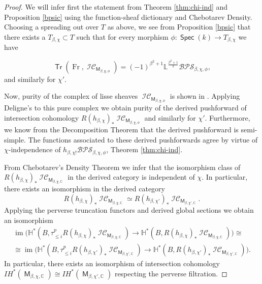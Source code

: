 \documentclass{article}
\DeclareMathOperator{\image}{im}
\DeclareMathOperator{\M}{{\mathsf{M}}}
\DeclareMathOperator{\Tr}{\mathsf{Tr}}
\DeclareMathOperator{\Fr}{Fr}
\DeclareMathOperator{\Spec}{\mathsf{Spec}}
\DeclareMathOperator{\CIC}{\mathcal{IC}}
\newcommand{\BC}{{\mathbb{C}}}
\newcommand{\BH}{{\mathbb{H}}}
\newcommand{\BL}{{\mathbb{L}}}
\newcommand{\BPS}{\mathcal{BPS} }
\theoremstyle{definition}
\theoremstyle{plain}
\begin{document}
\begin{proof}

We will infer first the statement from Theorem \ref{thm:chi-ind} and Proposition \ref{bpsic} using the function-sheaf dictionary and Chebotarev Density. Choosing a spreading out over $T$ as above, we see from  Proposition \ref{bpsic} that there exists a $T_{\beta,\chi} \subset T$ such that for every morphism $\phi:\Spec(k) \to T_{\beta,\chi}$ we have

\[\Tr(\Fr,\CIC_{\M_{\beta,\chi,\phi}}) = (-1)^{\beta^2+1} \BL^{\frac{\beta^2+1}{2}} \BPS_{\beta,\chi,\phi},  \]
and similarly for $\chi'$.

Now, purity of the complex of lisse sheaves $\CIC_{\M_{\beta,\chi,\phi}}$ is shown in \cite[Corollaire 5.3.4]{beilinson2018faisceaux}. Applying Deligne's \cite[Proposition 6.2.6]{deligne1980conjecture} to this pure complex we obtain purity of the derived pushforward of intersection cohomology $R(h_{\beta,\chi})_*\CIC_{\M_{\beta,\chi,\phi}}$ and similarly for $\chi'$. Furthermore, we know from the Decomposition Theorem that the derived pushforward is semi-simple.
The functions associated to these derived pushforwards agree by virtue of $\chi$-independence of $h_{\beta,\chi!}\BPS_{\beta,\chi,\phi}$, Theorem \ref{thm:chi-ind}.

From Chebotarev's Density Theorem we infer that the isomorphism class of $R(h_{\beta,\chi})_*\CIC_{\M_{\beta,\chi,\BC}}$ in the derived category is independent of $\chi$. In particular, there exists an isomorphism in the derived category
$$R(h_{\beta,\chi})_*\CIC_{\M_{\beta,\chi,\BC}} \simeq R(h_{\beta,\chi'})_*\CIC_{\M_{\beta,\chi',\BC}}.$$
Applying the perverse truncation functors and derived global sections we obtain an isomorphism
\begin{eqnarray*}\image \big(\BH^*(B,\tau^p_{\leq i}R(h_{\beta,\chi})_*\CIC_{\M_{\beta,\chi,\BC}}) \to \BH^*(B,R(h_{\beta,\chi})_*\CIC_{\M_{\beta,\chi,\BC}})\big) \cong \\ \cong \image \big(\BH^*(B,\tau^p_{\leq i}R(h_{\beta,\chi'})_*\CIC_{\M_{\beta,\chi',\BC}}) \to \BH^*(B,R(h_{\beta,\chi'})_*\CIC_{\M_{\beta,\chi',\BC}})\big).\end{eqnarray*}
In particular, there exists an isomorphism of intersection cohomology $IH^*(\M_{\beta,\chi,\BC}) \cong IH^*(\M_{\beta,\chi',\BC})$
respecting the perverse filtration.


\end{proof}
\end{document}
